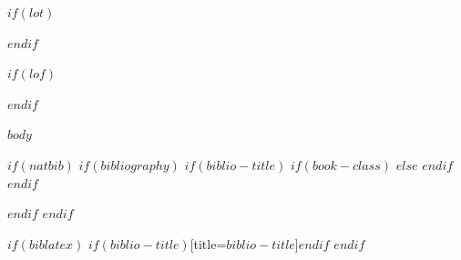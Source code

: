 \documentclass[10pt, letterpaper, titlepage, oneside, openright, final, article]{memoir}
\begin{document}
$if(lot)$
    \listoftables
$endif$

$if(lof)$
    \listoffigures
$endif$


\mainmatter
$body$

\appendix

\backmatter

$if(natbib)$
    $if(bibliography)$
        $if(biblio-title)$
            $if(book-class)$
                \renewcommand\bibname{$biblio-title$}
            $else$
                \renewcommand\refname{$biblio-title$}
            $endif$
        $endif$
        
    $endif$
$endif$

$if(biblatex)$
    \printbibliography$if(biblio-title)$[title=$biblio-title$]$endif$
$endif$


\end{document}
